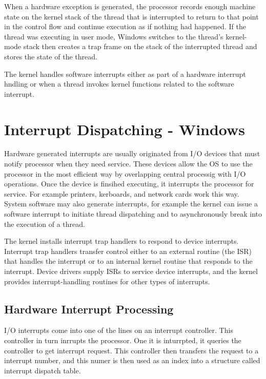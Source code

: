 \documentclass[letterpaper,10pt,draftclsnofoot,onecolumn]{IEEEtran}
\begin{document}
When a hardware exception is generated, the processor records enough machine state on the kernel stack of the thread that is interrupted to return to that point in the control flow and continue execution as if nothing had happened. If the thread was executing in user mode, Windows switches to the thread's kernel-mode stack then creates a trap frame on the stack of the interrupted thread and stores the state of the thread.\cite{[1]}

The kernel handles software interrupts either as part of a hardware interrupt hndling or when a thread invokes kernel functions related to the software interrupt.

\section*{Interrupt Dispatching - Windows}

Hardware generated interrupts are usually originated from I/O devices that must notify processor when they need service. These devices allow the OS to use the processor in the most efficient way by overlapping central processig with I/O operations. Once the device is finsihed executing, it interrupts the processor for service. For example printers, kerboards, and network cards work this way. System software may also generate interrupts, for example the kernel can issue a software interrupt to initiate thread dispatching and to asynchronously break into the execution of a thread.

The kernel installs interrupt trap handlers to respond to device interrupts. Interrupt trap handlers transfer control either to an external routine (the ISR) that handles the interrupt or to an internal kernel routine that responds to the interrupt. Device drivers supply ISRs to service device interrupts, and the kernel provides interrupt-handling routines for other types of interrupts.\cite{[1]}

\subsection*{Hardware Interrupt Processing}

I/O interrupts come into one of the lines on an interrupt controller. This controller in turn inrrupts the processor. One it is inturrpted, it queries the controller to get interrupt request. This controller then transfers the request to a interrupt number, and this numer is then used as an index into a structure called interrupt dispatch table. 
\end{document}
